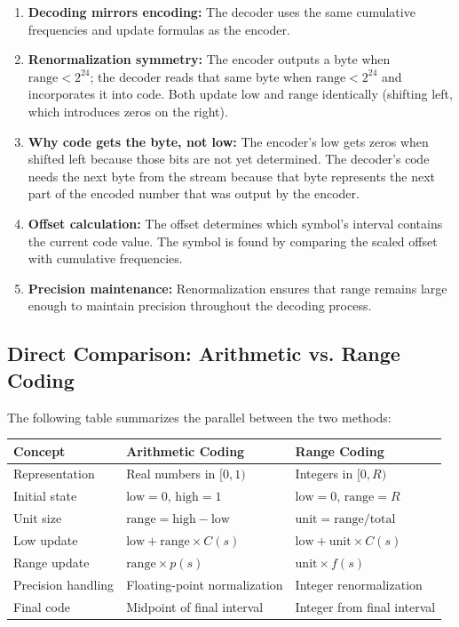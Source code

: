 \documentclass[12pt]{article}
\begin{document}
\begin{enumerate}
    \item \textbf{Decoding mirrors encoding:} The decoder uses the same cumulative frequencies and update formulas as the encoder.
    
    \item \textbf{Renormalization symmetry:} The encoder outputs a byte when $\text{range} < 2^{24}$; the decoder reads that same byte when $\text{range} < 2^{24}$ and incorporates it into $\text{code}$. Both update $\text{low}$ and $\text{range}$ identically (shifting left, which introduces zeros on the right).
    
    \item \textbf{Why code gets the byte, not low:} The encoder's $\text{low}$ gets zeros when shifted left because those bits are not yet determined. The decoder's $\text{code}$ needs the next byte from the stream because that byte represents the next part of the encoded number that was output by the encoder.
    
    \item \textbf{Offset calculation:} The offset determines which symbol's interval contains the current code value. The symbol is found by comparing the scaled offset with cumulative frequencies.
    
    \item \textbf{Precision maintenance:} Renormalization ensures that $\text{range}$ remains large enough to maintain precision throughout the decoding process.
\end{enumerate}

\subsection{Direct Comparison: Arithmetic vs. Range Coding}

The following table summarizes the parallel between the two methods:

\begin{center}
\begin{tabular}{l | l | l}
\toprule
\textbf{Concept} & \textbf{Arithmetic Coding} & \textbf{Range Coding} \\
\midrule
Representation & Real numbers in $[0,1)$ & Integers in $[0, R)$ \\ \hline
Initial state & $\text{low}=0$, $\text{high}=1$ & $\text{low}=0$, $\text{range}=R$ \\ \hline
Unit size & $\text{range} = \text{high}-\text{low}$ & $\text{unit} = \text{range} / \text{total}$ \\ \hline
Low update & $\text{low} + \text{range} \times C(s)$ & $\text{low} + \text{unit} \times C(s)$ \\ \hline
Range update & $\text{range} \times p(s)$ & $\text{unit} \times f(s)$ \\ \hline
Precision handling & Floating-point normalization & Integer renormalization \\ \hline
Final code & Midpoint of final interval & Integer from final interval \\ \hline
\bottomrule
\end{tabular}
\end{center}
\end{document}
